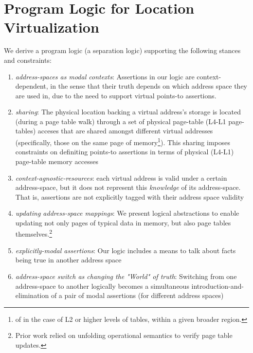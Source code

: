 \section{Program Logic for Location Virtualization}
\label{sec:logic}
\newcommand{\gammaPred}{\delta}
\newcommand{\gammaPreds}{\delta\textsf{s}}
\newcommand{\rtv}{\textsf{rtv}}
\newcommand{\qone}{\texttt{q1}}
\newcommand{\qtwo}{\texttt{q2}}
\newcommand{\qthree}{\texttt{q3}}
\newcommand{\qfour}{\texttt{q4}}

\newcommand{\sumwalkabs}[3]{
  \ownGhost\gammaPred{\authfrag{\singletonMap{#1}{(#2, #3)}}}
}

\newcommand{\sumapaces}[2]{
  \ownGhost\gammaPreds{\authfrag{\singletonMap{#1}{#2}}}
}
\newcommand{\ptableabswalk}[1]{\mathcal{A}\textsf{bsPTableWalk}(#1)}
\newcommand{\ptablestore}{\theta}

We derive a program logic (a separation logic) supporting the following stances and constraints:
\begin{enumerate}
\item \textit{address-spaces as modal contexts}: Assertions in our logic are context-dependent,
  in the sense that their truth depends on which address space they are used in, due to the need to support virtual points-to assertions.
\item \textit{sharing}: The physical location backing a virtual address's storage is located (during a page table walk) through a 
      set of physical page-table (L4-L1 page-tables) acceses that are shared amongst different virtual addresses (specifically,
      those on the same page of memory\footnote{of in the case of L2 or higher levels of tables, within a given broader region.}).
      This sharing imposes constraints on definiting points-to assertions
      in terms of physical (L4-L1) page-table memory accesses
\item \textit{context-agnostic-resources}: each virtual address is valid under a certain address-space, 
      but it does not represent this \textit{knowledge} of its address-space. 
      That is, assertions are not explicitly tagged with their address space validity
\item \textit{updating address-space mappings}: We present logical abstractions to enable 
      updating not only pages of typical data in memory, but also page tables themselves.\footnote{Prior work relied on unfolding operational semantics
      to verify page table updates.}
\item \textit{explicitly-modal assertions}: Our logic includes a means to talk about facts being true
      in another address space
\item \textit{address-space switch as changing the "World" of truth}: Switching from one address-space to another logically
      becomes a simultaneous introduction-and-elimination of a pair of modal assertions (for different address spaces)
\end{enumerate}

